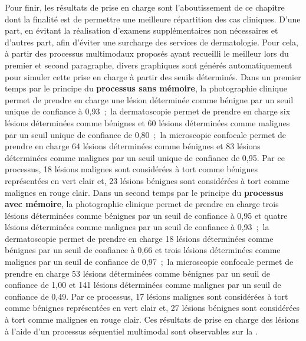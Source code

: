 Pour finir, les résultats de prise en charge sont l'aboutissement de ce chapitre dont la finalité est de permettre une meilleure répartition des cas cliniques. D'une part, en évitant la réalisation d'examens supplémentaires non nécessaires et d'autres part, afin d'éviter une surcharge des services de dermatologie. Pour cela, à partir des processus multimodaux proposés ayant recueilli le meilleur \fscore{} lors du premier et second paragraphe, divers graphiques sont générés automatiquement pour simuler cette prise en charge à partir des seuils déterminés. Dans un premier temps par le principe du \textbf{processus sans mémoire}, la photographie clinique permet de prendre en charge une lésion déterminée comme bénigne par un seuil unique de confiance à 0,93~;~la dermatoscopie permet de prendre en charge six lésions déterminées comme bénignes et 60 lésions déterminées comme malignes par un seuil unique de confiance de 0,80~;~la microscopie confocale permet de prendre en charge 64 lésions déterminées comme bénignes et 83 lésions déterminées comme malignes par un seuil unique de confiance de 0,95. Par ce processus, 18 lésions malignes sont considérées à tort comme bénignes représentées en vert clair et, 23 lésions bénignes sont considérées à tort comme malignes en rouge clair. Dans un second temps par le principe du \textbf{processus avec mémoire}, la photographie clinique permet de prendre en charge trois lésions déterminées comme bénignes par un seuil de confiance à 0,95 et quatre lésions déterminées comme malignes par un seuil de confiance à 0,93~;~la dermatoscopie permet de prendre en charge 18 lésions déterminées comme bénignes par un seuil de confiance à 0,66 et trois lésions déterminées comme malignes par un seuil de confiance de 0,97~;~la microscopie confocale permet de prendre en charge 53 lésions déterminées comme bénignes par un seuil de confiance de 1,00 et 141 lésions déterminées comme malignes par un seuil de confiance de 0,49. Par ce processus, 17 lésions malignes sont considérées à tort comme bénignes représentées en vert clair et, 27 lésions bénignes sont considérées à tort comme malignes en rouge clair. Ces résultats de prise en charge des lésions à l'aide d'un processus séquentiel multimodal sont observables sur la .\par

